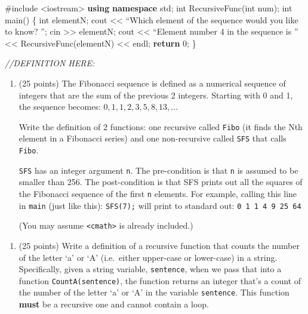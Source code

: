 \documentclass[
]{article}
\newenvironment{Shaded}{}{}
\newcommand{\CommentTok}[1]{\textcolor[rgb]{0.38,0.63,0.69}{\textit{#1}}}
\newcommand{\ControlFlowTok}[1]{\textcolor[rgb]{0.00,0.44,0.13}{\textbf{#1}}}
\newcommand{\DataTypeTok}[1]{\textcolor[rgb]{0.56,0.13,0.00}{#1}}
\newcommand{\DecValTok}[1]{\textcolor[rgb]{0.25,0.63,0.44}{#1}}
\newcommand{\ImportTok}[1]{#1}
\newcommand{\KeywordTok}[1]{\textcolor[rgb]{0.00,0.44,0.13}{\textbf{#1}}}
\newcommand{\NormalTok}[1]{#1}
\newcommand{\PreprocessorTok}[1]{\textcolor[rgb]{0.74,0.48,0.00}{#1}}
\providecommand{\tightlist}{%
  \setlength{\itemsep}{0pt}\setlength{\parskip}{0pt}}
\begin{document}
\begin{Shaded}
\begin{Highlighting}[]
\PreprocessorTok{\#include }\ImportTok{\textless{}iostream\textgreater{}}
\KeywordTok{using} \KeywordTok{namespace}\NormalTok{ std;}
\DataTypeTok{int}\NormalTok{ RecursiveFunc(}\DataTypeTok{int}\NormalTok{ num);}
\DataTypeTok{int}\NormalTok{ main() \{}
   \DataTypeTok{int}\NormalTok{ elementN;}
\NormalTok{   cout \textless{}\textless{} “Which element of the sequence would you like to know? ”;}
\NormalTok{   cin \textgreater{}\textgreater{} elementN;}
\NormalTok{   cout \textless{}\textless{} “Element number }\DecValTok{4}\NormalTok{ in the sequence is ” }
\NormalTok{        \textless{}\textless{} RecursiveFunc(elementN) \textless{}\textless{} endl;}
   \ControlFlowTok{return} \DecValTok{0}\NormalTok{;}
\NormalTok{\}}

\CommentTok{//DEFINITION HERE:}
\end{Highlighting}
\end{Shaded}

\pagebreak

\begin{enumerate}
\def\labelenumi{\arabic{enumi}.}
\setcounter{enumi}{5}
\item
  (25 points) The Fibonacci sequence is defined as a numerical sequence
  of integers that are the sum of the previous 2 integers. Starting with
  0 and 1, the sequence becomes: \(0, 1, 1, 2, 3, 5, 8, 13, ...\)

  Write the definition of 2 functions: one recursive called
  \texttt{Fibo} (it finds the Nth element in a Fibonacci series) and one
  non-recursive called \texttt{SFS} that calls \texttt{Fibo}.

  \texttt{SFS} has an integer argument \texttt{n}. The pre-condition is
  that \texttt{n} is assumed to be smaller than 256. The post-condition
  is that SFS prints out all the squares of the Fibonacci sequence of
  the first \texttt{n} elements. For example, calling this line in
  \texttt{main} (just like this): \texttt{SFS(7);} will print to
  standard out: \texttt{0\ 1\ 1\ 4\ 9\ 25\ 64}

  (You may assume \texttt{\textless{}cmath\textgreater{}} is already
  included.)
\end{enumerate}

\pagebreak

\begin{enumerate}
\def\labelenumi{\arabic{enumi}.}
\setcounter{enumi}{6}
\tightlist
\item
  (25 points) Write a definition of a recursive function that counts the
  number of the letter `a' or `A' (i.e.~either upper-case or lower-case)
  in a string. Specifically, given a string variable, \texttt{sentence},
  when we pass that into a function \texttt{CountA(sentence)}, the
  function returns an integer that's a count of the number of the letter
  `a' or `A' in the variable \texttt{sentence}. This function
  \textbf{must} be a recursive one and cannot contain a loop.
\end{enumerate}
\end{document}
